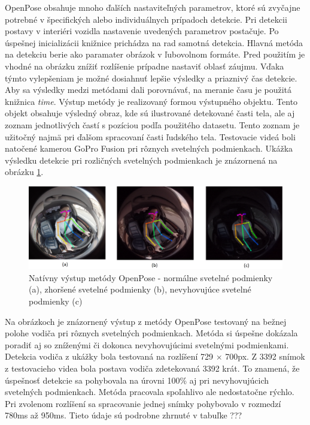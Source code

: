 \documentclass[slovak,master,dept460,male,cpp,cpdeclaration]{diploma}
\begin{document}
OpenPose obsahuje mnoho ďalších nastaviteľných parametrov, ktoré  sú zvyčajne potrebné v špecifických alebo individuálnych prípadoch detekcie. Pri detekcii postavy v interiéri vozidla nastavenie uvedených parametrov postačuje. Po úspešnej inicializácii knižnice prichádza na rad samotná detekcia.  Hlavná metóda na detekciu berie  ako paramater  obrázok v ľubovolnom formáte. Pred použitím je vhodné  na obrázku  znížiť rozlíšenie prípadne  nastaviť oblasť záujmu. Vďaka týmto vylepšeniam je možné dosiahnuť lepšie výsledky  a priaznivý čas detekcie. Aby sa výsledky  medzi metódami dali porovnávať, na meranie času je použitá knižnica \textit{time}. Výstup metódy je realizovaný formou výstupného objektu. Tento objekt obsahuje výsledný obraz, kde sú ilustrované detekované časti tela, ale aj zoznam jednotlivých častí s pozíciou podľa použitého datasetu. Tento zoznam je užitočný najmä pri  ďalšom spracovaní časti ľudského tela. Testovacie videá boli  natočené kamerou GoPro Fusion pri rôznych svetelných podmienkach. Ukážka výsledku detekcie pri rozličných  svetelných podmienkach je  znázornená na  obrázku \ref{fig:op_result}.

\begin{figure}[H]
	\centering
	\includegraphics[width=1\textwidth]{Figures/op_result.png}
	\caption{Natívny výstup metódy OpenPose - normálne svetelné podmienky (a), zhoršené svetelné podmienky (b), nevyhovujúce svetelné podmienky (c)}
	\label{fig:op_result}
\end{figure}

Na obrázkoch je znázornený výstup  z metódy OpenPose testovaný na bežnej polohe vodiča pri rôznych svetelných podmienkach. Metóda si úspešne dokázala poradiť aj so zníženými či dokonca nevyhovujúcimi svetelnými podmienkami. Detekcia vodiča z ukážky bola testovaná na rozlíšení 729 $\times$ 700px. Z 3392 snímok z testovacieho videa bola postava vodiča zdetekovaná  3392 krát. To znamená, že úspešnosť detekcie sa pohybovala na úrovni 100\% aj pri nevyhovujúcich svetelných podmienkach. Metóda pracovala spoľahlivo ale nedostatočne rýchlo. Pri zvolenom rozlíšení sa spracovanie jednej snímky pohybovalo v rozmedzí 780ms až 950ms. Tieto údaje sú podrobne zhrnuté v tabuľke ???
\end{document}
